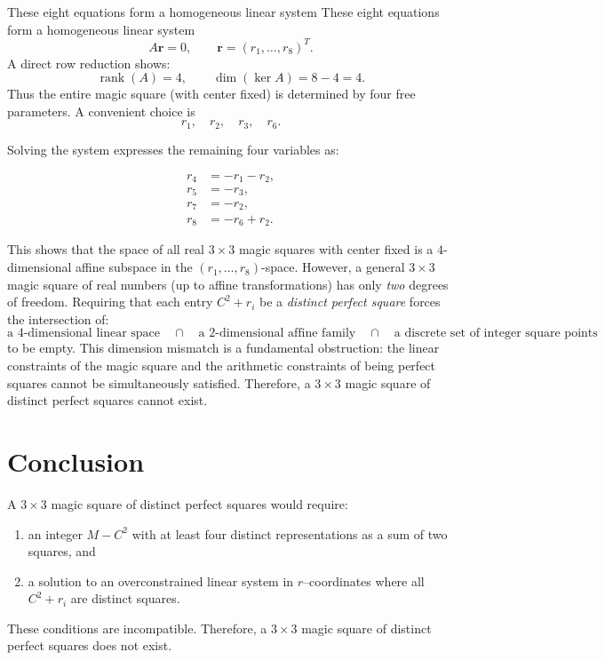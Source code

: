 \documentclass[12pt]{article}
\begin{document}
These eight equations form a homogeneous linear system
These eight equations form a homogeneous linear system \[ A\mathbf{r} = 0,\qquad \mathbf{r}=(r_1,\dots,r_8)^T. \] A direct row reduction shows: \[ \operatorname{rank}(A)=4, \qquad \dim(\ker A)=8-4=4. \] Thus the entire magic square (with center fixed) is determined by four free parameters. A convenient choice is \[ r_1,\quad r_2,\quad r_3,\quad r_6. \]


Solving the system expresses the remaining four variables as:

\[ 
\begin{aligned}
 r_4 &= -r_1 - r_2,\\
r_5 &= -r_3,\\ 
r_7 &= -r_2,\\
r_8 &= -r_6 + r_2.
 \end{aligned}\]



This shows that the space of all real $3\times 3$ magic squares with center fixed is a $4$-dimensional affine subspace in the $(r_1,\dots,r_8)$-space. However, a general $3\times 3$ magic square of real numbers (up to affine transformations) has only \emph{two} degrees of freedom. Requiring that each entry $C^2+r_i$ be a \emph{distinct perfect square} forces the intersection of: \[ \text{a $4$-dimensional linear space} \quad\cap\quad \text{a $2$-dimensional affine family} \quad\cap\quad \text{a discrete set of integer square points} \] to be empty. This dimension mismatch is a fundamental obstruction: the linear constraints of the magic square and the arithmetic constraints of being perfect squares cannot be simultaneously satisfied. Therefore, a $3\times 3$ magic square of distinct perfect squares cannot exist.








\section*{Conclusion}

A $3\times 3$ magic square of distinct perfect squares would require:
\begin{enumerate}
    \item an integer $M-C^2$ with at least four distinct representations as a
    sum of two squares, and
    \item a solution to an overconstrained linear system in $r$--coordinates
    where all $C^2+r_i$ are distinct squares.
\end{enumerate}
These conditions are incompatible.  Therefore, a $3\times 3$ magic square of
distinct perfect squares does not exist.
\end{document}
